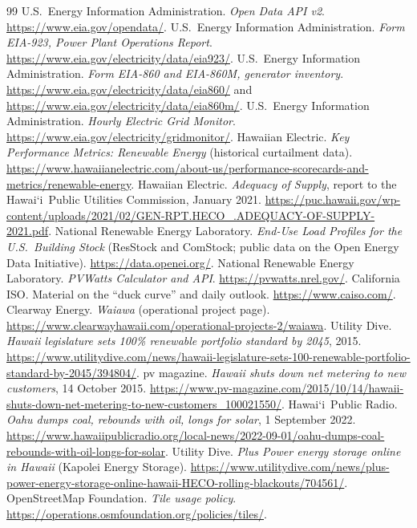 \documentclass[11pt,a4paper]{article}
\newcommand{\okina}{\textquoteleft}
\newcommand{\Hawaii}{\texorpdfstring{Hawai\okina i}{Hawaii}}
\begin{document}
\begin{thebibliography}{99}\small
{} U.S.\ Energy Information Administration. \emph{Open Data API v2}. \url{https://www.eia.gov/opendata/}.
 U.S.\ Energy Information Administration. \emph{Form EIA-923, Power Plant Operations Report}. \url{https://www.eia.gov/electricity/data/eia923/}.
 U.S.\ Energy Information Administration. \emph{Form EIA-860 and EIA-860M, generator inventory}. \url{https://www.eia.gov/electricity/data/eia860/} and \url{https://www.eia.gov/electricity/data/eia860m/}.
 U.S.\ Energy Information Administration. \emph{Hourly Electric Grid Monitor}. \url{https://www.eia.gov/electricity/gridmonitor/}.
 Hawaiian Electric. \emph{Key Performance Metrics: Renewable Energy} (historical curtailment data). \url{https://www.hawaiianelectric.com/about-us/performance-scorecards-and-metrics/renewable-energy}.
 Hawaiian Electric. \emph{Adequacy of Supply}, report to the \Hawaii\ Public Utilities Commission, January 2021. \url{https://puc.hawaii.gov/wp-content/uploads/2021/02/GEN-RPT.HECO_.ADEQUACY-OF-SUPPLY-2021.pdf}.
 National Renewable Energy Laboratory. \emph{End-Use Load Profiles for the U.S.\ Building Stock} (ResStock and ComStock; public data on the Open Energy Data Initiative). \url{https://data.openei.org/}.
 National Renewable Energy Laboratory. \emph{PVWatts Calculator and API}. \url{https://pvwatts.nrel.gov/}.
 California ISO. Material on the ``duck curve'' and daily outlook. \url{https://www.caiso.com/}.
 Clearway Energy. \emph{Waiawa} (operational project page). \url{https://www.clearwayhawaii.com/operational-projects-2/waiawa}.
 Utility Dive. \emph{Hawaii legislature sets 100\% renewable portfolio standard by 2045}, 2015. \url{https://www.utilitydive.com/news/hawaii-legislature-sets-100-renewable-portfolio-standard-by-2045/394804/}.
 pv magazine. \emph{Hawaii shuts down net metering to new customers}, 14 October 2015. \url{https://www.pv-magazine.com/2015/10/14/hawaii-shuts-down-net-metering-to-new-customers_100021550/}.
 \Hawaii\ Public Radio. \emph{Oahu dumps coal, rebounds with oil, longs for solar}, 1 September 2022. \url{https://www.hawaiipublicradio.org/local-news/2022-09-01/oahu-dumps-coal-rebounds-with-oil-longs-for-solar}.
 Utility Dive. \emph{Plus Power energy storage online in Hawaii} (Kapolei Energy Storage). \url{https://www.utilitydive.com/news/plus-power-energy-storage-online-hawaii-HECO-rolling-blackouts/704561/}.
 OpenStreetMap Foundation. \emph{Tile usage policy}. \url{https://operations.osmfoundation.org/policies/tiles/}.
\end{thebibliography}
\end{document}
